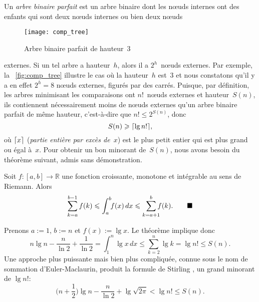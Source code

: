 %
Un \emph{arbre binaire parfait}
est un arbre binaire dont les n{\oe}uds internes ont des enfants qui
sont deux n{\oe}uds internes ou bien deux n{\oe}uds
\begin{wrapfigure}[]{r}[0pt]{0pt}
\centering
\texttt{[image: comp\_tree]}
\caption{Arbre binaire parfait de hauteur~\(3\)}
\label{fig:comp_tree}
\end{wrapfigure}
externes. Si un tel arbre a hauteur~\(h\), alors il a
\(2^h\)~n{\oe}uds externes. Par exemple, la \fig~\vref{fig:comp_tree}
illustre le cas où la hauteur~\(h\) est~\(3\) et nous constatons qu'il
y a en effet \(2^h=8\) n{\oe}uds externes, figurés par des
carrés. Puisque, par définition, les arbres minimisant les
comparaisons ont \(n!\)~n{\oe}uds externes et hauteur~\(S(n)\), ils
contiennent nécessairement moins de n{\oe}uds externes qu'un arbre
binaire parfait de même hauteur, c'est-à-dire que \(n! \leqslant
2^{S(n)}\), donc
\begin{equation*}
S(n) \geqslant \lceil{\lg n!}\rceil,
\end{equation*}
où \(\lceil{x}\rceil\) (\textsl{partie entière par excès de~\(x\)})
  est le plus petit entier
qui est plus grand ou égal à~\(x\). Pour obtenir un bon minorant
de~\(S(n)\), nous avons besoin du théorème suivant, admis sans
démonstration.  \setlength{\intextsep}{12pt}
\begin{thm}
\label{thm:integral_bounds}
Soit \(f\colon [a,b] \rightarrow \mathbb{R}\) une fonction croissante,
monotone et intégrable au sens de Riemann. Alors
\begin{equation}
\abovedisplayskip=0pt
\sum_{k=a}^{b-1}f(k) \leqslant \int_{a}^{b}{\!\!f(x)} \,dx
                   \leqslant \sum_{k=a+1}^{b}{\!\!\!f(k)}.
\tag*{\(\blacksquare\)}
\end{equation}
\end{thm}
\noindent Prenons \(a := 1\), \(b := n\) et \(f(x) := \lg x\). Le
théorème implique donc
\begin{equation*}
n\lg n - \frac{n}{\ln 2} + \frac{1}{\ln 2}
= \int_{1}^{n}{\!\!\lg x} \,dx \leqslant \sum_{k=2}^{n}{\lg k}
= \lg n! \leqslant S(n).
\end{equation*}
Une approche plus puissante mais bien plus compliquée, connue sous le
nom de sommation d'Euler-Maclaurin, produit la formule de Stirling
\citep[chap.~4]{SedgewickFlajolet_1996},
un grand minorant de \(\lg n!\):
\begin{equation}
\Big(n + \frac{1}{2}\Big)\lg n - \frac{n}{\ln 2} + \lg\sqrt{2\pi}
< \lg n! \leqslant S(n).
\label{ineq:S_lower}
\end{equation}

